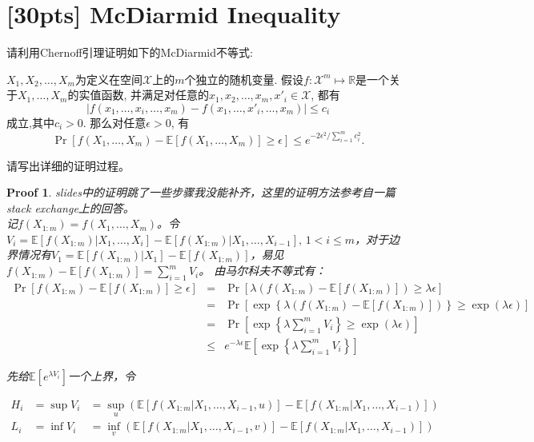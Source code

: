 \documentclass[a4paper,UTF8]{article}
\numberwithin{equation}{section}
\newtheorem*{myProof}{Proof}
\begin{document}
\section{[30pts] McDiarmid Inequality}
\noindent	请利用Chernoff引理证明如下的McDiarmid不等式:
	\begin{thm-box}
	$X_1,X_2,\ldots,X_m$为定义在空间$\mathcal{X}$上的$m$个独立的随机变量. 假设$f\colon \mathcal{X}^m\mapsto \mathbb{R}$是一个关于$X_1,\ldots,X_m$的实值函数, 并满足对任意的$x_1,x_2,\ldots,x_m,x'_i\in\mathcal{X}$, 都有
	\[
	|f(x_1,\ldots,x_i,\ldots,x_m)-f(x_1,\ldots,x'_i,\ldots,x_m)|\leq c_i
	\]
	成立,其中$c_i >0$. 那么对任意$\epsilon>0$, 有
	\[
	\Pr[f(X_1,\ldots,X_m)-\mathbb{E}[f(X_1,\ldots,X_m)]\geq\epsilon]\leq e^{-2\epsilon^2/\sum_{i=1}^mc_i^2}.
	\]
\end{thm-box}
	请写出详细的证明过程。
	\begin{myProof}slides中的证明跳了一些步骤我没能补齐，这里的证明方法参考自一篇stack exchange上的回答\cite{21513}。~\\

记$f(X_{1:m}) = f(X_1, \ldots, X_m)$。令$V_i = \mathbb{E}[f(X_{1:m}) | X_1, \ldots, X_i] - \mathbb{E}[f(X_{1:m}) | X_1, \ldots, X_{i-1}],\,1 < i \le m$，对于边界情况有$V_1 = \mathbb{E}[f(X_{1:m}) | X_1] - \mathbb{E}[f(X_{1:m})]$，易见$f(X_{1:m}) - \mathbb{E}[f(X_{1:m})] = \sum_{i=1}^m V_i$。
由马尔科夫不等式有：
\begin{eqnarray*}
\Pr[f(X_{1:m})-\mathbb{E}[f(X_{1:m})] \geq \epsilon] &=& \Pr[\lambda\left(f(X_{1:m})-\mathbb{E}[f(X_{1:m})]\right) \geq \lambda\epsilon] \\
&=& \Pr[\exp\left\{\lambda\left(f(X_{1:m})-\mathbb{E}[f(X_{1:m})]\right)\right\} \geq \exp(\lambda\epsilon)] \\
&=& \Pr\left[\exp\left\{\lambda\sum_{i=1}^m V_i\right\} \geq \exp(\lambda\epsilon)\right] \\
&\le& e^{-\lambda \epsilon} \mathbb{E}\left[ \exp\left\{\lambda\sum_{i=1}^m V_i\right\} \right]
\end{eqnarray*}

先给$\mathbb{E}\left[ e^{\lambda V_i} \right]$一个上界，令

\begin{eqnarray*}
H_i &= \sup V_i &= \sup_u ( \mathbb{E}[f(X_{1:m}|X_1, \ldots, X_{i-1}, u) ] - \mathbb{E}[f(X_{1:m}|X_1, \ldots, X_{i-1}) ] ) \\
L_i &= \inf V_i &= \inf_v ( \mathbb{E}[f(X_{1:m}|X_1, \ldots, X_{i-1}, v) ] - \mathbb{E}[f(X_{1:m}|X_1, \ldots, X_{i-1}) ] ) \\
\end{eqnarray*}


\end{myProof}
\end{document}
